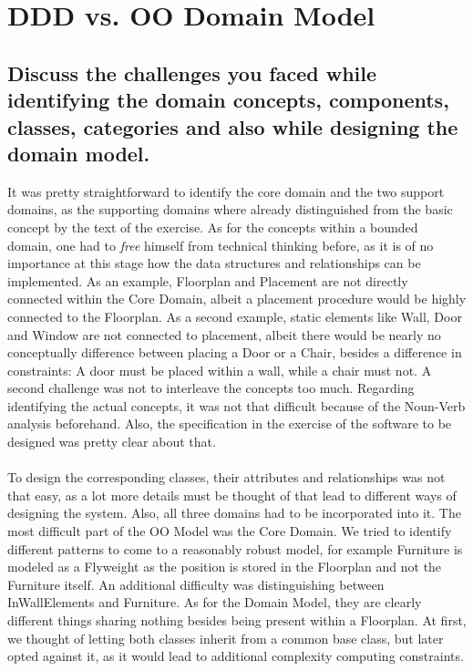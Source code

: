 \clearpage
\section{DDD vs. OO Domain Model}
		
		\subsection{Discuss the challenges you faced while identifying the domain concepts,
			components, classes, categories and also while designing the domain model.}
		
		It was pretty straightforward to identify the core domain and the two support domains, as the supporting domains where already distinguished from the basic concept by the text of the exercise.
		As for the concepts within a bounded domain, one had to \textit{free} himself from technical thinking before, as it is of no importance at this stage how the data structures and relationships can be implemented.
		As an example, Floorplan and Placement are not directly connected within the Core Domain, albeit a placement procedure would be highly connected to the Floorplan.
		As a second example, static elements like Wall, Door and Window are not connected to placement, albeit there would be nearly no conceptually difference between placing a Door or a Chair, besides a difference in constraints: A door must be placed within a wall, while a chair must not.
		A second challenge was not to interleave the concepts too much.
		Regarding identifying the actual concepts, it was not that difficult because of the Noun-Verb analysis beforehand.
		Also, the specification in the exercise of the software to be designed was pretty clear about that.
		\\ \ \\
		To design the corresponding classes, their attributes and relationships was not that easy, as a lot more details must be thought of that lead to different ways of designing the system.
		Also, all three domains had to be incorporated into it.
		The most difficult part of the OO Model was the Core Domain.
		We tried to identify different patterns to come to a reasonably robust model, for example Furniture is modeled as a Flyweight as the position is stored in the Floorplan and not the Furniture itself.
		An additional difficulty was distinguishing between InWallElements and Furniture.
		As for the Domain Model, they are clearly different things sharing nothing besides being present within a Floorplan.
		At first, we thought of letting both classes inherit from a common base class, but later opted against it, as it would lead to additional complexity computing constraints.

